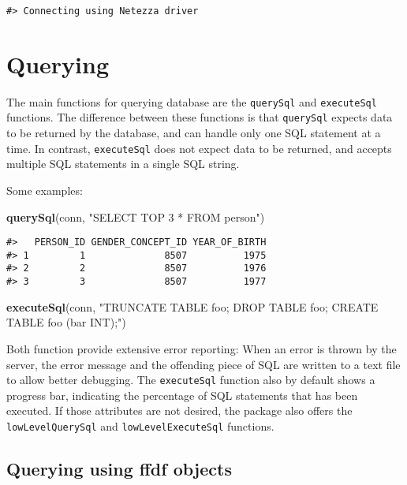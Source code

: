 \documentclass[]{article}
\newenvironment{Shaded}{\begin{snugshade}}{\end{snugshade}}
\newcommand{\KeywordTok}[1]{\textcolor[rgb]{0.13,0.29,0.53}{\textbf{#1}}}
\newcommand{\NormalTok}[1]{#1}
\newcommand{\StringTok}[1]{\textcolor[rgb]{0.31,0.60,0.02}{#1}}
\begin{document}
\begin{verbatim}
#> Connecting using Netezza driver
\end{verbatim}

\hypertarget{querying}{%
\section{Querying}\label{querying}}

The main functions for querying database are the \texttt{querySql} and
\texttt{executeSql} functions. The difference between these functions is
that \texttt{querySql} expects data to be returned by the database, and
can handle only one SQL statement at a time. In contrast,
\texttt{executeSql} does not expect data to be returned, and accepts
multiple SQL statements in a single SQL string.

Some examples:

\begin{Shaded}
\begin{Highlighting}[]
\KeywordTok{querySql}\NormalTok{(conn, }\StringTok{"SELECT TOP 3 * FROM person"}\NormalTok{)}
\end{Highlighting}
\end{Shaded}

\begin{verbatim}
#>   PERSON_ID GENDER_CONCEPT_ID YEAR_OF_BIRTH
#> 1         1              8507          1975
#> 2         2              8507          1976
#> 3         3              8507          1977
\end{verbatim}

\begin{Shaded}
\begin{Highlighting}[]
\KeywordTok{executeSql}\NormalTok{(conn, }\StringTok{"TRUNCATE TABLE foo; DROP TABLE foo; CREATE TABLE foo (bar INT);"}\NormalTok{)}
\end{Highlighting}
\end{Shaded}

Both function provide extensive error reporting: When an error is thrown
by the server, the error message and the offending piece of SQL are
written to a text file to allow better debugging. The
\texttt{executeSql} function also by default shows a progress bar,
indicating the percentage of SQL statements that has been executed. If
those attributes are not desired, the package also offers the
\texttt{lowLevelQuerySql} and \texttt{lowLevelExecuteSql} functions.

\hypertarget{querying-using-ffdf-objects}{%
\subsection{Querying using ffdf
objects}\label{querying-using-ffdf-objects}}
\end{document}

